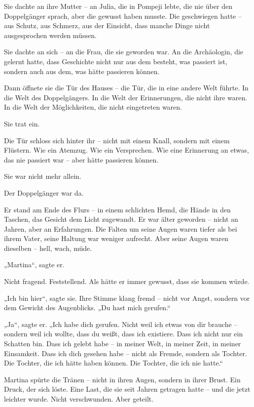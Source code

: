 \documentclass[
]{article}
\begin{document}
Sie dachte an ihre Mutter -- an Julia, die in Pompeji lebte, die nie über den Doppelgänger sprach, aber die gewusst haben musste. Die geschwiegen hatte -- aus Schutz, aus Schmerz, aus der Einsicht, dass manche Dinge nicht ausgesprochen werden müssen.

Sie dachte an sich -- an die Frau, die sie geworden war. An die Archäologin, die gelernt hatte, dass Geschichte nicht nur aus dem besteht, was passiert ist, sondern auch aus dem, was hätte passieren können.

Dann öffnete sie die Tür des Hauses -- die Tür, die in eine andere Welt führte. In die Welt des Doppelgängers. In die Welt der Erinnerungen, die nicht ihre waren. In die Welt der Möglichkeiten, die nicht eingetreten waren.

Sie trat ein.

Die Tür schloss sich hinter ihr -- nicht mit einem Knall, sondern mit einem Flüstern. Wie ein Atemzug. Wie ein Versprechen. Wie eine Erinnerung an etwas, das nie passiert war -- aber hätte passieren können.

Sie war nicht mehr allein.

Der Doppelgänger war da.

Er stand am Ende des Flurs -- in einem schlichten Hemd, die Hände in den Taschen, das Gesicht dem Licht zugewandt. Er war älter geworden -- nicht an Jahren, aber an Erfahrungen. Die Falten um seine Augen waren tiefer als bei ihrem Vater, seine Haltung war weniger aufrecht. Aber seine Augen waren dieselben -- hell, wach, müde.

„Martina``, sagte er.

Nicht fragend. Feststellend. Als hätte er immer gewusst, dass sie kommen würde.

„Ich bin hier``, sagte sie. Ihre Stimme klang fremd -- nicht vor Angst, sondern vor dem Gewicht des Augenblicks. „Du hast mich gerufen.``

„Ja``, sagte er. „Ich habe dich gerufen. Nicht weil ich etwas von dir brauche -- sondern weil ich wollte, dass du weißt, dass ich existiere. Dass ich nicht nur ein Schatten bin. Dass ich gelebt habe -- in meiner Welt, in meiner Zeit, in meiner Einsamkeit. Dass ich dich gesehen habe -- nicht als Fremde, sondern als Tochter. Die Tochter, die ich hätte haben können. Die Tochter, die ich nie hatte.``

Martina spürte die Tränen -- nicht in ihren Augen, sondern in ihrer Brust. Ein Druck, der sich löste. Eine Last, die sie seit Jahren getragen hatte -- und die jetzt leichter wurde. Nicht verschwunden. Aber geteilt.
\end{document}
